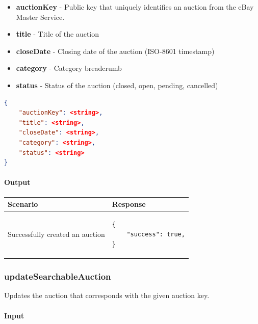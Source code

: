 \documentclass[12pt,a4paper]{article}
\begin{document}
\begin{itemize}
    \item \textbf{auctionKey} - Public key that uniquely identifies an auction from the eBay Master Service.
    \item \textbf{title} - Title of the auction 
    \item \textbf{closeDate} - Closing date of the auction (ISO-8601 timestamp)
    \item \textbf{category} - Category breadcrumb
    \item \textbf{status} - Status of the auction (closed, open, pending, cancelled)
\end{itemize}
\begin{lstlisting}[language=json,numbers=none]
{
    "auctionKey": <string>,
    "title": <string>,
    "closeDate": <string>,
    "category": <string>,
    "status": <string>
}
\end{lstlisting}

\paragraph{Output}
\begin{center}
    \begin{tabular}{| p{7cm} | l |}
        \hline
        \textbf{Scenario} & \textbf{Response} \\
        \hline
        Successfully created an auction & 
        \begin{lstlisting}[language=tableJson,firstnumber=1]
{
    "success": true,
}

        \end{lstlisting} \\ 
        
        \hline
    \end{tabular}
\end{center}

\pagebreak
\subsubsection{updateSearchableAuction}
\label{ref:usa}
Updates the auction that corresponds with the given auction key.


\paragraph{Input}
\end{document}
